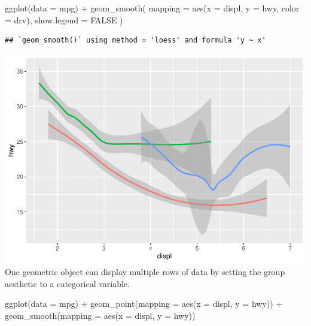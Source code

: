 \documentclass[
]{article}
\newenvironment{Shaded}{\begin{snugshade}}{\end{snugshade}}
\newcommand{\AttributeTok}[1]{\textcolor[rgb]{0.77,0.63,0.00}{#1}}
\newcommand{\ConstantTok}[1]{\textcolor[rgb]{0.00,0.00,0.00}{#1}}
\newcommand{\FunctionTok}[1]{\textcolor[rgb]{0.00,0.00,0.00}{#1}}
\newcommand{\NormalTok}[1]{#1}
\newcommand{\SpecialCharTok}[1]{\textcolor[rgb]{0.00,0.00,0.00}{#1}}
\begin{document}
\begin{Shaded}
\begin{Highlighting}[]
\FunctionTok{ggplot}\NormalTok{(}\AttributeTok{data =}\NormalTok{ mpg) }\SpecialCharTok{+}
  \FunctionTok{geom\_smooth}\NormalTok{(}
    \AttributeTok{mapping =} \FunctionTok{aes}\NormalTok{(}\AttributeTok{x =}\NormalTok{ displ, }\AttributeTok{y =}\NormalTok{ hwy, }\AttributeTok{color =}\NormalTok{ drv),}
    \AttributeTok{show.legend =} \ConstantTok{FALSE}
\NormalTok{  )}
\end{Highlighting}
\end{Shaded}

\begin{verbatim}
## `geom_smooth()` using method = 'loess' and formula 'y ~ x'
\end{verbatim}

\includegraphics{Assignments_files/figure-latex/unnamed-chunk-43-3.pdf}
One geometric object can display multiple rows of data by setting the
group aesthetic to a categorical variable.

\begin{Shaded}
\begin{Highlighting}[]
\FunctionTok{ggplot}\NormalTok{(}\AttributeTok{data =}\NormalTok{ mpg) }\SpecialCharTok{+} 
  \FunctionTok{geom\_point}\NormalTok{(}\AttributeTok{mapping =} \FunctionTok{aes}\NormalTok{(}\AttributeTok{x =}\NormalTok{ displ, }\AttributeTok{y =}\NormalTok{ hwy)) }\SpecialCharTok{+}
  \FunctionTok{geom\_smooth}\NormalTok{(}\AttributeTok{mapping =} \FunctionTok{aes}\NormalTok{(}\AttributeTok{x =}\NormalTok{ displ, }\AttributeTok{y =}\NormalTok{ hwy))}
\end{Highlighting}
\end{Shaded}
\end{document}

